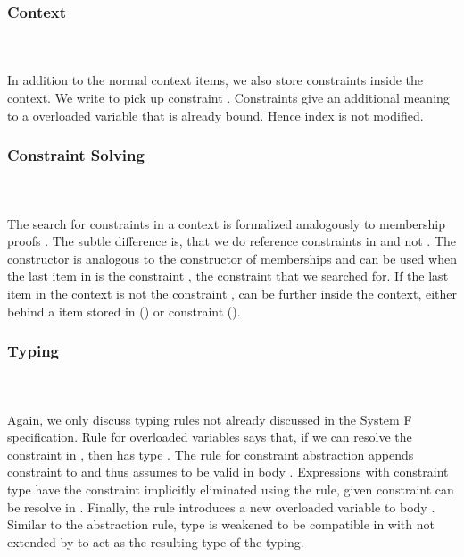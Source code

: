 \subsubsection{Context}\hfill\\\\
In addition to the normal context items, we also store constraints inside the context.
\FoCtx
We write    to pick up constraint . 
Constraints give an additional meaning to a overloaded variable that is already bound. Hence index  is not modified.

\subsubsection{Constraint Solving}\hfill\\\\
The search for constraints in a context is formalized analogously to membership proofs   . The subtle difference is, that we do reference constraints in  and not . 
\FoCstrSolve
The  constructor is analogous to the  constructor of memberships and can be used when the last item in  is the constraint , the constraint that we searched for. 
If the last item in the context is not the constraint ,  can be further inside the context, either behind a item stored in  () or constraint (). 

\subsubsection{Typing}\hfill\\\\
Again, we only discuss typing rules not already discussed in the System F specification. 
\FoTyping
Rule  for overloaded variables says that, if we can resolve the constraint  \Constr{:}  in , then  has type . 
The rule for constraint abstraction  appends constraint  to  and thus assumes  to be valid in body . 
Expressions  with constraint type \Constr{[}  \Constr{]⇒}  have the constraint implicitly eliminated using the  rule, given constraint  can be resolve in . 
Finally, the rule  introduces a new overloaded variable to body . Similar to the abstraction rule, type  is weakened to be compatible in  with  not extended by  to act as the resulting type of the typing.

